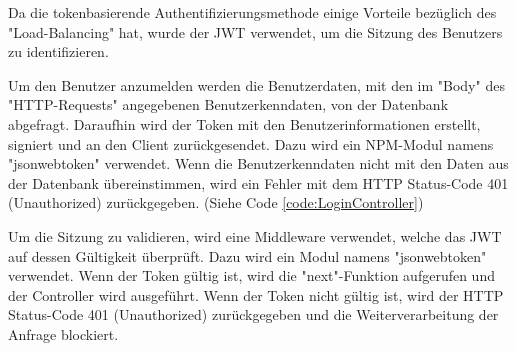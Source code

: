 
Da die tokenbasierende Authentifizierungsmethode einige Vorteile bezüglich des "Load-Balancing" hat, wurde der JWT verwendet, um die Sitzung des Benutzers zu identifizieren.


Um den Benutzer anzumelden werden die Benutzerdaten, mit den im "Body" des "HTTP-Requests" angegebenen Benutzerkenndaten, von der Datenbank abgefragt. Daraufhin wird der Token mit den Benutzerinformationen erstellt, signiert und an den Client zurückgesendet. Dazu wird ein NPM-Modul namens "jsonwebtoken" verwendet. \cite{NpmJWT} Wenn die Benutzerkenndaten nicht mit den Daten aus der Datenbank übereinstimmen, wird ein Fehler mit dem HTTP Status-Code 401 (Unauthorized) zurückgegeben. (Siehe Code \ref{code:LoginController})


\pagebreak
{}

Um die Sitzung zu validieren, wird eine Middleware verwendet, welche das JWT auf dessen Gültigkeit überprüft. Dazu wird ein Modul namens "jsonwebtoken" verwendet. \cite{NpmJWT} Wenn der Token gültig ist, wird die "next"-Funktion aufgerufen und der Controller wird ausgeführt. Wenn der Token nicht gültig ist, wird der HTTP Status-Code 401 (Unauthorized) zurückgegeben und die Weiterverarbeitung der Anfrage blockiert.

